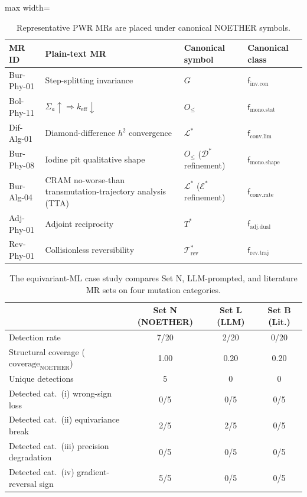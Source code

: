 \documentclass[acmsmall,screen,review]{acmart}
\begin{document}
\begin{table}[h]
\centering
\caption{Representative PWR MRs are placed under canonical NOETHER symbols.}
\label{tab:elementwise}
\footnotesize
\begin{adjustbox}{max width=\textwidth}
\begin{tabular}{llll}
\toprule
\textbf{MR ID} & \textbf{Plain-text MR} & \textbf{Canonical symbol} & \textbf{Canonical class} \\
\midrule
Bur-Phy-01 & Step-splitting invariance & $G$ & $\mathsf{f}_{\mathrm{inv}.\mathrm{con}}$ \\
Bol-Phy-11 & $\Sigma_a\!\uparrow \Rightarrow k_{\mathrm{eff}}\!\downarrow$ & $O_{\le}$ & $\mathsf{f}_{\mathrm{mono}.\mathrm{stat}}$ \\
Dif-Alg-01 & Diamond-difference $h^2$ convergence & $\mathcal{L}^{*}$ & $\mathsf{f}_{\mathrm{conv}.\mathrm{lim}}$ \\
Bur-Phy-08 & Iodine pit qualitative shape & $O_{\le}$ ($\mathcal{D}^{*}$ refinement) & $\mathsf{f}_{\mathrm{mono}.\mathrm{shape}}$ \\
Bur-Alg-04 & CRAM no-worse-than transmutation-trajectory analysis (TTA) & $\mathcal{L}^{*}$ ($\mathcal{E}^{*}$ refinement) & $\mathsf{f}_{\mathrm{conv}.\mathrm{rate}}$ \\
Adj-Phy-01 & Adjoint reciprocity & $T^{*}$ & $\mathsf{f}_{\mathrm{adj}.\mathrm{dual}}$ \\
Rev-Phy-01 & Collisionless reversibility & $\mathcal{T}^{*}_{\mathrm{rev}}$ & $\mathsf{f}_{\mathrm{rev}.\mathrm{traj}}$ \\
\bottomrule
\end{tabular}
\end{adjustbox}
\end{table}

\begin{table}[h]
\centering
\caption{The equivariant-ML case study compares Set N, LLM-prompted, and literature MR sets on four mutation categories.}
\label{tab:case-study}
\small
\begin{tabular}{lccc}
\toprule
& Set N (NOETHER) & Set L (LLM) & Set B (Lit.) \\
\midrule
Detection rate & 7/20 & 2/20 & 0/20 \\
Structural coverage ($\mathrm{coverage}_{\mathrm{NOETHER}}$) & 1.00 & 0.20 & 0.20 \\
Unique detections & 5 & 0 & 0 \\
Detected cat.~(i) wrong-sign loss & 0/5 & 0/5 & 0/5 \\
Detected cat.~(ii) equivariance break & 2/5 & 2/5 & 0/5 \\
Detected cat.~(iii) precision degradation & 0/5 & 0/5 & 0/5 \\
Detected cat.~(iv) gradient-reversal sign & 5/5 & 0/5 & 0/5 \\
\bottomrule
\end{tabular}
\end{table}
\end{document}
